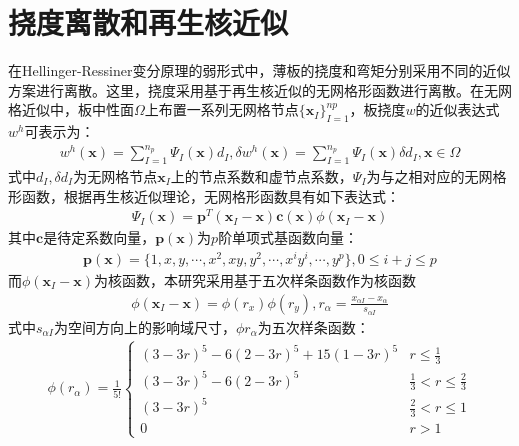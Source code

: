 \documentclass[a4paper]{article}
\begin{document}
\section{挠度离散和再生核近似}
在Hellinger-Ressiner变分原理的弱形式中，薄板的挠度和弯矩分别采用不同的近似方案进行离散。这里，挠度采用基于再生核近似的无网格形函数进行离散。在无网格近似中，板中性面$\Omega$上布置一系列无网格节点$\{\pmb{x}_I\}_{I=1}^{np}$，板挠度$w$的近似表达式$w^h$可表示为：
\begin{equation}
\begin{split}
    w^h(\pmb{x})=\sum_{I=1}^{n_p}\Psi_I(\pmb{x})d_I,\delta w^h(\pmb{x})=\sum_{I=1}^{n_p}\Psi_I(\pmb{x})\delta d_I,\pmb{x}\in\Omega
\end{split}
\end{equation}
式中$d_{I},\delta d_I$为无网格节点$\pmb{x}_I$上的节点系数和虚节点系数，$\Psi_I$为与之相对应的无网格形函数，根据再生核近似理论，无网格形函数具有如下表达式：
\begin{equation}
\begin{split}
    \Psi_I(\pmb{x})=\pmb{p}^T(\pmb{x}_I-\pmb{x})\pmb{c}(\pmb{x})\phi(\pmb{x}_I-\pmb{x})
\end{split}
\end{equation}
其中$\pmb{c}$是待定系数向量，$\pmb{p}(\pmb{x})$为$p$阶单项式基函数向量：
\begin{equation}
\begin{split}
    \pmb{p}(\pmb{x})=\{1,x,y,\dotsb ,x^2,xy,y^2,\dotsb,x^iy^i,\dotsb,y^p\},0\le i+j\le p
\end{split}
\end{equation}
而$\phi(\pmb{x}_I-\pmb{x})$为核函数，本研究采用基于五次样条函数作为核函数
\begin{equation}
\begin{split}
    \phi(\pmb{x}_I-\pmb{x})=\phi(r_x)\phi(r_y),r_{\alpha}=\frac{x_{\alpha I}-x_{\alpha}}{s_{\alpha I}}
\end{split}
\end{equation}
式中$s_{\alpha I}$为空间方向上的影响域尺寸，$\phi r_{\alpha}$为五次样条函数：
\begin{equation}
\begin{split}
    \phi(r_{\alpha})=\frac{1}{5!}\begin{cases}
        (3-3r)^5-6(2-3r)^5+15(1-3r)^5&r\le\frac{1}{3}\\
        (3-3r)^5-6(2-3r)^5&\frac{1}{3}<r\le\frac{2}{3}\\
        (3-3r)^5&\frac{2}{3}<r\le1\\
        0&r>1
    \end{cases}
\end{split}
\end{equation}\par
\end{document}
